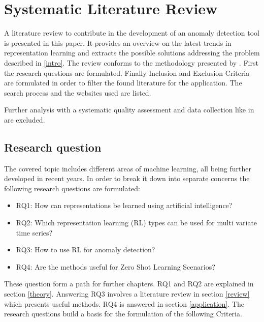 \section{Systematic Literature Review}\label{methods}
A literature review to contribute in the development of an anomaly detection tool is presented in this paper. It provides an overview on the latest trends in representation learning and extracts the possible solutions addressing the problem described in \ref{intro}. The review conforms to the methodology presented by \cite{kitchenham_systematic_2009}. First the research questions are formulated. Finally Inclusion and Exclusion Criteria are formulated in order to filter the found literature for the application. The search process and the websites used are listed.

Further analysis with a systematic quality assessment and data collection like in \cite{kitchenham_systematic_2009} are excluded.
\subsection{Research question}
The covered topic includes different areas of machine learning, all being further developed in recent years.
In order to break it down into separate concerns the following research questions are formulated:
\begin{itemize}
  \item RQ1: How can representations be learned using artificial intelligence?
  \item RQ2: Which representation learning (RL) types can be used for multi variate time series?
  \item RQ3: How to use RL for anomaly detection?
  \item RQ4: Are the methods useful for Zero Shot Learning Scenarios?
\end{itemize}
These question form a path for further chapters. RQ1 and RQ2 are explained in section \ref{theory}. Answering RQ3 involves a literature review in section \ref{review} which presents useful methods. RQ4 is answered in section \ref{application}. The research questions build a basis for the formulation of the following Criteria.
